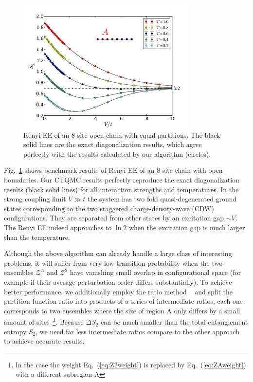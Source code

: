 \documentclass[twocolumn,english,prl,showpacs]{revtex4}
\begin{document}
\begin{figure}[t]
\centering
\includegraphics[width=9cm]{benchmark.pdf}
\caption{Renyi EE of an $8$-site open chain with equal partitions. The black solid lines are the exact diagonalization results, which agree perfectly with the results calculated by our algorithm (circles).}
\label{fig:1dbenchmark}
\end{figure}


Fig.~\ref{fig:1dbenchmark} shows benchmark results of Renyi EE of an $8$-site chain with open boundaries. Our CTQMC results perfectly reproduce the exact diagonalization results (black solid lines) for all interaction strengths and temperatures. In the strong coupling limit $V\gg t $ the system has two fold quasi-degenerated ground states corresponding to the two staggered charge-density-wave (CDW) configurations. They are separated from other states by an excitation gap $\sim V$. The Renyi EE indeed approaches to $\ln 2$ when the excitation gap is much larger than the temperature.  
  

Although the above algorithm can already handle a large class of interesting problems, it will suffer from very low transition probability when the two ensembles $\mathcal{Z}^{A}$ and $\mathcal{Z}^{2}$ have vanishing small overlap in configurational space (for example if their average perturbation order differs substantially). To achieve better performance, we additionally employ the ratio method ~\cite{Hastings:2010dca, Humeniuk:2012cq} and split the partition function ratio into products of a series of intermediate ratios, each one corresponds to two ensembles where the size of region A only differs by a small amount of sites~\footnote{In the case the weight Eq.~(\ref{eq:Z2weight}) is replaced by Eq.~(\ref{eq:ZAweight}) with a different subregion A}. Because $\Delta S_{2}$ can be much smaller than  the total entanglement entropy $S_{2}$, we need far less intermediate ratios compare to the other approach~\cite{Broecker:2014ud} to achieve accurate results. 
\end{document}
